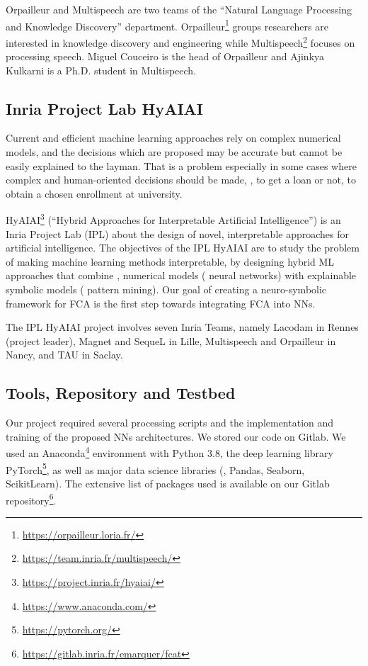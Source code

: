 Orpailleur and Multispeech are two teams of the ``Natural Language Processing and Knowledge Discovery'' department.
Orpailleur\footnote{\url{https://orpailleur.loria.fr/}} groups researchers are interested in knowledge discovery and engineering while
Multispeech\footnote{\url{https://team.inria.fr/multispeech/}} focuses on processing speech.
Miguel Couceiro is the head of Orpailleur and Ajinkya Kulkarni is a Ph.D. student in Multispeech.

\subsection{Inria Project Lab HyAIAI\label{sec:hyaiai}}
Current and efficient machine learning approaches rely on complex numerical models, and the decisions which are proposed may be accurate but cannot be easily explained to the layman.
That is a problem especially in some cases where complex and human-oriented decisions should be made, \eg{}, to get a loan or not, to obtain a chosen enrollment at university.

HyAIAI\footnote{\url{https://project.inria.fr/hyaiai/}} (``Hybrid Approaches for Interpretable Artificial Intelligence'') is an Inria Project Lab (IPL) about the design of novel, interpretable approaches for artificial intelligence.
%
The objectives of the IPL HyAIAI are to study the problem of making machine learning methods interpretable, by designing hybrid ML approaches that combine \soa{},   numerical models (\eg{} neural networks) with explainable symbolic models (\eg{} pattern mining). %
%
Our goal of creating a neuro-symbolic framework for FCA is the first step towards integrating FCA into NNs.

The IPL HyAIAI project involves seven Inria Teams, namely Lacodam in Rennes (project leader), Magnet and SequeL in Lille, Multispeech and Orpailleur in Nancy, and TAU in Saclay.



\subsection{Tools, Repository and Testbed\label{sec:g5k}}
Our project required several processing scripts and the implementation and training of the proposed NNs architectures.
We stored our code on Gitlab.
We used an Anaconda\footnote{\url{https://www.anaconda.com/}} environment with Python 3.8, the deep learning library PyTorch\footnote{\url{https://pytorch.org/}}, as well as major data science libraries (\eg{}, Pandas, Seaborn, ScikitLearn).
The extensive list of packages used is available on our Gitlab repository\footnote{\url{https://gitlab.inria.fr/emarquer/fcat}}.

